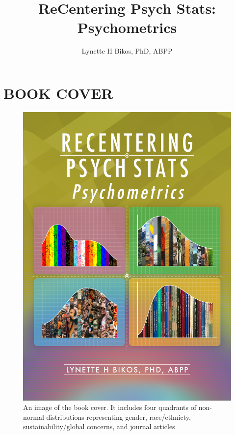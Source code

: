 \documentclass[
  english,
]{book}
\title{ReCentering Psych Stats: Psychometrics}
\author{Lynette H Bikos, PhD, ABPP}
\date{}
\begin{document}
\maketitle

{
\setcounter{tocdepth}{1}
\tableofcontents
}
\hypertarget{book-cover}{%
\chapter*{BOOK COVER}\label{book-cover}}

\begin{figure}
\centering
\includegraphics{images/ReCenterPsychStats-Psychometrics-bookcover.png}
\caption{An image of the book cover. It includes four quadrants of non-normal distributions representing gender, race/ethnicty, sustainability/global concerns, and journal articles}
\end{figure}
\end{document}

